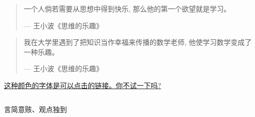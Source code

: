 \begin{frame}{}
  \centerline{\Large {}}
  \begin{quote}
    一个人倘若需要从思想中得到快乐, 那么他的第一个欲望就是学习。

    \hfill --- 王小波《思维的乐趣》
  \end{quote}
\end{frame}

\begin{frame}{}
  \centerline{\Large {}}
  \begin{quote}
    我在大学里遇到了把知识当作幸福来传播的数学老师, 他使学习数学变成了一种乐趣。

    \hfill --- 王小波《思维的乐趣》
  \end{quote}
\end{frame}

\begin{frame}{}
  \centerline{\href{https://github.com/hengxin/problem-solving-class-lectures/blob/master/2017/2018-spring-2nd-semester/2-summary/tutorial/parts/cheating.md}{这种颜色的字体是可以点击的链接。你不试一下吗?}}
\end{frame}



\begin{frame}{}
  \begin{columns}
  \end{columns}

  \vspace{0.80cm}
  \centerline{言简意赅、观点独到}
\end{frame}

